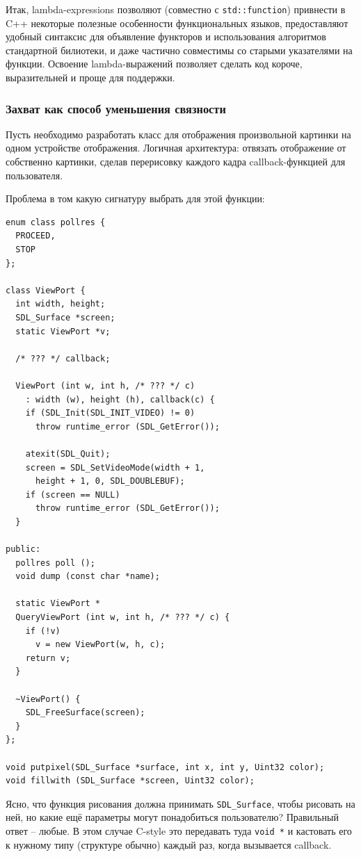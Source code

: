 \documentclass[a4paper,12pt,oneside]{article}
\begin{document}
Итак, lambda-expressions позволяют (совместно с \lstinline!std::function!) привнести в C++ некоторые полезные особенности функциональных языков, предоставляют удобный синтаксис для объявление функторов и использования алгоритмов стандартной билиотеки, и даже частично совместимы со старыми указателями на функции. Освоение lambda-выражений позволяет сделать код короче, выразительней и проще для поддержки.

\subsubsection{Захват как способ уменьшения связности}

Пусть необходимо разработать класс для отображения произвольной картинки на одном устройстве отображения. Логичная архитектура: отвязать отображение от собственно картинки, сделав перерисовку каждого кадра callback-функцией для пользователя.

Проблема в том какую сигнатуру выбрать для этой функции:

\begin{lstlisting}
enum class pollres {
  PROCEED,
  STOP
};

class ViewPort {
  int width, height;
  SDL_Surface *screen;
  static ViewPort *v;

  /* ??? */ callback;

  ViewPort (int w, int h, /* ??? */ c)
    : width (w), height (h), callback(c) {
    if (SDL_Init(SDL_INIT_VIDEO) != 0)
      throw runtime_error (SDL_GetError());

    atexit(SDL_Quit);
    screen = SDL_SetVideoMode(width + 1, 
      height + 1, 0, SDL_DOUBLEBUF);
    if (screen == NULL)
      throw runtime_error (SDL_GetError());
  }

public:
  pollres poll ();
  void dump (const char *name);

  static ViewPort *
  QueryViewPort (int w, int h, /* ??? */ c) {
    if (!v)
      v = new ViewPort(w, h, c);
    return v;
  }

  ~ViewPort() {
    SDL_FreeSurface(screen);
  }
};

void putpixel(SDL_Surface *surface, int x, int y, Uint32 color);
void fillwith (SDL_Surface *screen, Uint32 color);
\end{lstlisting}

Ясно, что функция рисования должна принимать \lstinline!SDL_Surface!, чтобы рисовать на ней, но какие ещё параметры могут понадобиться пользователю? Правильный ответ -- любые. В этом случае C-style это передавать туда \lstinline!void *! и кастовать его к нужному типу (структуре обычно) каждый раз, когда вызывается callback.
\end{document}
